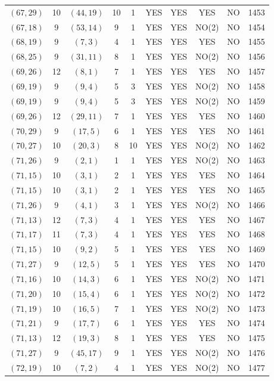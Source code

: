 \begin{longtable}{|c|c|c|c|c|c|c|c|c|c|}
$(67, 29)$ & 10 & $(44, 19)$ & 10 & 1 & YES & YES & YES & NO & 1453\\
$(67, 18)$ & 9 & $(53, 14)$ & 9 & 1 & YES & YES & NO(2) & NO & 1454\\
$(68, 19)$ & 9 & $(7, 3)$ & 4 & 1 & YES & YES & YES & NO & 1455\\
$(68, 25)$ & 9 & $(31, 11)$ & 8 & 1 & YES & YES & NO(2) & NO & 1456\\
$(69, 26)$ & 12 & $(8, 1)$ & 7 & 1 & YES & YES & YES & NO & 1457\\
$(69, 19)$ & 9 & $(9, 4)$ & 5 & 3 & YES & YES & NO(2) & NO & 1458\\
$(69, 19)$ & 9 & $(9, 4)$ & 5 & 3 & YES & YES & NO(2) & NO & 1459\\
$(69, 26)$ & 12 & $(29, 11)$ & 7 & 1 & YES & YES & YES & NO & 1460\\
$(70, 29)$ & 9 & $(17, 5)$ & 6 & 1 & YES & YES & YES & NO & 1461\\
$(70, 27)$ & 10 & $(20, 3)$ & 8 & 10 & YES & YES & NO(2) & NO & 1462\\
$(71, 26)$ & 9 & $(2, 1)$ & 1 & 1 & YES & YES & NO(2) & NO & 1463\\
$(71, 15)$ & 10 & $(3, 1)$ & 2 & 1 & YES & YES & YES & NO & 1464\\
$(71, 15)$ & 10 & $(3, 1)$ & 2 & 1 & YES & YES & YES & NO & 1465\\
$(71, 26)$ & 9 & $(4, 1)$ & 3 & 1 & YES & YES & NO(2) & NO & 1466\\
$(71, 13)$ & 12 & $(7, 3)$ & 4 & 1 & YES & YES & YES & NO & 1467\\
$(71, 17)$ & 11 & $(7, 3)$ & 4 & 1 & YES & YES & YES & NO & 1468\\
$(71, 15)$ & 10 & $(9, 2)$ & 5 & 1 & YES & YES & YES & NO & 1469\\
$(71, 27)$ & 9 & $(12, 5)$ & 5 & 1 & YES & YES & YES & NO & 1470\\
$(71, 16)$ & 10 & $(14, 3)$ & 6 & 1 & YES & YES & NO(2) & NO & 1471\\
$(71, 20)$ & 10 & $(15, 4)$ & 6 & 1 & YES & YES & NO(2) & NO & 1472\\
$(71, 19)$ & 10 & $(16, 5)$ & 7 & 1 & YES & YES & NO(2) & NO & 1473\\
$(71, 21)$ & 9 & $(17, 7)$ & 6 & 1 & YES & YES & YES & NO & 1474\\
$(71, 13)$ & 12 & $(19, 3)$ & 8 & 1 & YES & YES & YES & NO & 1475\\
$(71, 27)$ & 9 & $(45, 17)$ & 9 & 1 & YES & YES & NO(2) & NO & 1476\\
$(72, 19)$ & 10 & $(7, 2)$ & 4 & 1 & YES & YES & NO(2) & NO & 1477\\

\end{longtable}
